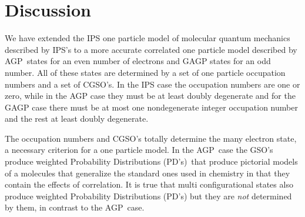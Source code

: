 \documentclass{preprint}
\begin{document}
\section{Discussion\label{Discussion}}

We have extended the IPS one particle model of molecular quantum mechanics
described by IPS's to a more accurate correlated one particle model
described by AGP\ states for an even number of electrons and GAGP states for
an odd number. All of these states are determined by a set of one particle
occupation numbers and a set of CGSO's. In the IPS case the occupation
numbers are one or zero, while in the AGP case they must be at least doubly
degenerate and for the GAGP case there must be at most one nondegenerate
integer occupation number and the rest at least doubly degenerate.

The occupation numbers and CGSO's totally determine the many electron state,
a necessary criterion for a one particle model. In the AGP\ case the GSO's
produce weighted Probability Distributions (PD's)\ that produce pictorial
models of a molecules that generalize the standard ones used in chemistry in
that they contain the effects of correlation. It is true that multi
configurational states also produce weighted Probability Distributions
(PD's) but they are \emph{not} determined by them, in contrast to the AGP\
case.
\end{document}
